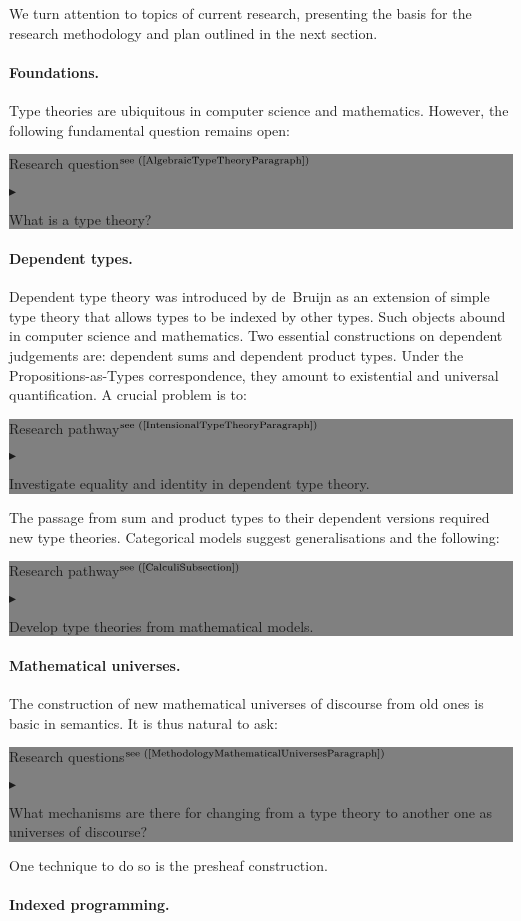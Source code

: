 \documentclass[11pt,twocolumn]{article}
\newenvironment{btritemize}
  {\begin{list}{\btr}
  {\setlength{\topsep}{2pt}
   \setlength{\partopsep}{2pt}
   \setlength{\itemsep}{2.5pt}
   \setlength{\parsep}{2.5pt}
   \setlength{\leftmargin}{1em}
   \setlength{\labelwidth}{.5em}}}
  {\end{list}}
\newcommand{\mytextsf}[1]{\textsf{\small #1}}
\newcommand{\eg}{\emph{eg.}}
\newcommand{\btr}{$\blacktriangleright$}
\newcommand{\reqpsize}{8.113395cm}%
\newcommand{\req}[2]{\begin{center}\colorbox{grey}{\begin{minipage}{\reqpsize} 
  \mytextsf{Research question}\hfill$^{\mbox{\scriptsize see (#1) }}$\\[-5.5mm]
  \begin{btritemize}
  \item #2
  \end{btritemize}
\end{minipage}}\end{center}}
\newcommand{\reqs}[2]{\begin{center}\colorbox{grey}{\begin{minipage}{\reqpsize}
  \mytextsf{Research questions}\hfill$^{\mbox{\scriptsize see (#1) }}$\\[-5.5mm]
  \begin{btritemize}
  \item #2
  \end{btritemize}
\end{minipage}}\end{center}}
\newcommand{\rep}[2]{\begin{center}\colorbox{grey}{\begin{minipage}{\reqpsize}
  \mytextsf{Research pathway}\hfill$^{\mbox{\scriptsize see (#1) }}$\\[-5.5mm]
  \begin{btritemize}
  \item #2
  \end{btritemize}
\end{minipage}}\end{center}}
\begin{document}
We turn attention to topics of current research, presenting the basis for
the research methodology and plan outlined in the next section.

\paragraph*{Foundations.}

Type theories are ubiquitous in computer science and mathematics.  However,
the following fundamental question remains open:
\req{\ref{AlgebraicTypeTheoryParagraph}}
{What is a type theory?}

\paragraph*{Dependent types.}

Dependent type theory was introduced by de~Bruijn %
as an extension of simple type theory that allows types to be indexed by
other types.  Such objects abound in computer science and mathematics.  
Two essential constructions on dependent judgements are: dependent sums and
dependent product types.  %
Under the Propositions-as-Types correspondence, they amount to existential and
universal quantification.  A crucial problem 
is to:
\rep{\ref{IntensionalTypeTheoryParagraph}}
  {Investigate equality and identity in dependent type theory.}

The passage from sum and product types to their dependent versions required new
type theories.  Categorical models suggest generalisations and the following: 
\rep{\ref{CalculiSubsection}}
  {Develop type theories from mathematical models.}

\paragraph*{Mathematical universes.}

The construction of new mathematical universes of discourse from old ones is
basic in semantics.  It is thus natural to ask:
\reqs{\ref{MethodologyMathematicalUniversesParagraph}}
  {What mechanisms are there for changing from a type theory to another one
    as universes of discourse? 
%
}
%
One technique to do so is the presheaf construction.  

\paragraph*{Indexed programming.}
\end{document}
